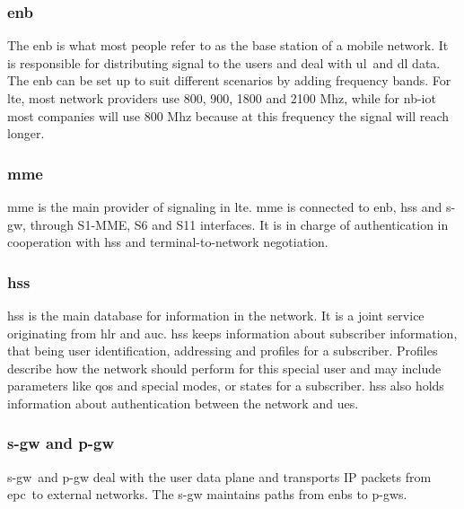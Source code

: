 \documentclass[USenglish]{ifimaster}  %
\begin{document}
\subsubsection{\acrshort{enb}}
The \acrfull{enb} is what most people refer to as the base station of a mobile network. It is responsible for distributing signal to the users and deal with \acrshort{ul} and \acrshort{dl} data. The \acrshort{enb} can be set up to suit different scenarios by adding frequency bands. For \acrshort{lte}, most network providers use 800, 900, 1800 and 2100 Mhz, while for \acrshort{nb-iot} most companies will use 800 Mhz because at this frequency the signal will reach longer.

\subsubsection{\acrshort{mme}}
\acrfull{mme} is the main provider of signaling in \acrshort{lte}. \acrshort{mme} is connected to \acrshort{enb}, \acrshort{hss} and \acrshort{s-gw}, through S1-MME, S6 and S11 interfaces. It is in charge of authentication in cooperation with \acrshort{hss} and terminal-to-network negotiation.

\subsubsection{\acrshort{hss}}
\acrfull{hss} is the main database for information in the network. It is a joint service originating from \acrfull{hlr} and \acrfull{auc}. \acrshort{hss} keeps information about subscriber information, that being user identification, addressing and profiles for a subscriber. Profiles describe how the network should perform for this special user and may include parameters like \acrfull{qos} and special modes, or states for a subscriber. \acrshort{hss} also holds information about authentication between the network and \acrshort{ue}s.

\subsubsection{\acrshort{s-gw} and \acrshort{p-gw}}
\acrfull{s-gw} and \acrfull{p-gw} deal with the user data plane and transports IP packets from \acrshort{epc} to external networks. The \acrshort{s-gw} maintains paths from \acrshort{enb}s to \acrshort{p-gw}s.
\end{document}

